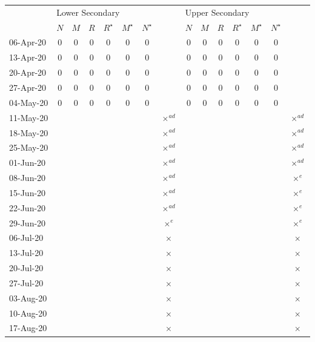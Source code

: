 \documentclass[fleqn,10pt]{wlscirep}
\begin{document}
\begin{table}															
\begin{center}																	 
{\tiny		
\begin{tabular}{l|ccccccc|ccccccc}																
& \multicolumn{7}{l|}{Lower Secondary} & \multicolumn{7}{l}{Upper Secondary} \\																
	&$N$	&$M$	&$R$	&$R^\star$	&$M^\star$	&$N^\star$	&		&$N$	&$M$	&$R$	&$R^\star$	&$M^\star$	&$N^\star$		\\
06-Apr-20	&$0$	&$0$	&$0$	&$0$	&$0$	&$0$	&		&$0$	&$0$	&$0$	&$0$	&$0$	&$0$	&	\\
13-Apr-20	&$0$	&$0$	&$0$	&$0$	&$0$	&$0$	&		&$0$	&$0$	&$0$	&$0$	&$0$	&$0$	&	\\
20-Apr-20	&$0$	&$0$	&$0$	&$0$	&$0$	&$0$	&		&$0$	&$0$	&$0$	&$0$	&$0$	&$0$	&	\\
27-Apr-20	&$0$	&$0$	&$0$	&$0$	&$0$	&$0$	&		&$0$	&$0$	&$0$	&$0$	&$0$	&$0$	&	\\
04-May-20	&$0$	&$0$	&$0$	&$0$	&$0$	&$0$	&		&$0$	&$0$	&$0$	&$0$	&$0$	&$0$	&	\\
11-May-20	&	&	&	&	&	&	&$\times^{ad}$		&	&	&	&	&	&	&$\times^{ad}$	\\
18-May-20	&	&	&	&	&	&	&$\times^{ad}$		&	&	&	&	&	&	&$\times^{ad}$	\\
25-May-20	&	&	&	&	&	&	&$\times^{ad}$		&	&	&	&	&	&	&$\times^{ad}$	\\
01-Jun-20	&	&	&	&	&	&	&$\times^{ad}$		&	&	&	&	&	&	&$\times^{ad}$	\\
08-Jun-20	&	&	&	&	&	&	&$\times^{ad}$		&	&	&	&	&	&	&$\times^{e}$	\\
15-Jun-20	&	&	&	&	&	&	&$\times^{ad}$		&	&	&	&	&	&	&$\times^{e}$	\\
22-Jun-20	&	&	&	&	&	&	&$\times^{ad}$		&	&	&	&	&	&	&$\times^{e}$	\\
29-Jun-20	&	&	&	&	&	&	&$\times^{e}$		&	&	&	&	&	&	&$\times^{e}$	\\
06-Jul-20	&	&	&	&	&	&	&$\times$		&	&	&	&	&	&	&$\times$	\\
13-Jul-20	&	&	&	&	&	&	&$\times$		&	&	&	&	&	&	&$\times$	\\
20-Jul-20	&	&	&	&	&	&	&$\times$		&	&	&	&	&	&	&$\times$	\\
27-Jul-20	&	&	&	&	&	&	&$\times$		&	&	&	&	&	&	&$\times$	\\
03-Aug-20	&	&	&	&	&	&	&$\times$		&	&	&	&	&	&	&$\times$	\\
10-Aug-20	&	&	&	&	&	&	&$\times$		&	&	&	&	&	&	&$\times$	\\
17-Aug-20	&	&	&	&	&	&	&$\times$		&	&	&	&	&	&	&$\times$	\\

\end{tabular}}
\end{center}
\end{table}
\end{document}
